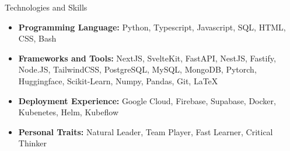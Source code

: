 \documentclass[]{mcdowellcv}
\begin{document}
	\begin{cvsection}{Technologies and Skills}
		\begin{cvsubsection}{}{}{}	
			\begin{itemize}
				\item \textbf{Programming Language: } Python, Typescript, Javascript, SQL, HTML, CSS, Bash
				\item \textbf{Frameworks and Tools: } NextJS, SvelteKit, FastAPI, NestJS, Fastify, Node.JS, TailwindCSS, PostgreSQL, MySQL, MongoDB, Pytorch, Huggingface, Scikit-Learn, Numpy, Pandas, Git, \LaTeX
				\item \textbf{Deployment Experience: } Google Cloud, Firebase, Supabase, Docker, Kubenetes, Helm, Kubeflow
				\item \textbf{Personal Traits: } Natural Leader, Team Player, Fast Learner, Critical Thinker
			\end{itemize}
		\end{cvsubsection}
	\end{cvsection}
	
\end{document}
